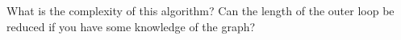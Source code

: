   What is the complexity of this algorithm? Can the length of the
  outer loop be reduced if you have some knowledge of the graph?
